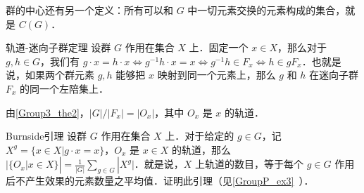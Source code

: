 群的中心还有另一个定义：所有可以和 $G$ 中一切元素交换的元素构成的集合，就是 $C(G)$．

\begin{theorem}{轨道-迷向子群定理}\label{Group3_the2}
设群 $G$ 作用在集合 $X$ 上．固定一个 $x\in X$，那么对于 $g, h\in G$，我们有 $g\cdot x=h\cdot x\iff g^{-1}h\cdot x=x\iff g^{-1}h\in F_x\iff h\in gF_x$．也就是说，如果两个群元素 $g, h$ 能够把 $x$ 映射到同一个元素上，那么 $g$ 和 $h$ 在迷向子群 $F_x$ 的同一个左陪集上．
\end{theorem}

\begin{corollary}{}\label{Group3_cor1}
由\autoref{Group3_the2}，$|G|/|F_x|=|O_x|$，其中 $O_x$ 是 $x$ 的轨道．
\end{corollary}

\begin{exercise}{Burnside引理}\label{Group3_exe2}
设群 $G$ 作用在集合 $X$ 上．对于给定的 $g\in G$，记 $X^g=\{x\in X|g\cdot x=x\}$，$O_x$ 是 $x\in X$ 的轨道，那么 $|\{O_x|x\in X\}|=\frac{1}{|G|}\sum_{g\in G}|X^g|$．就是说，$X$ 上轨道的数目，等于每个 $g\in G$ 作用后不产生效果的元素数量之平均值．证明此引理（见\autoref{GroupP_ex3}~）．
\end{exercise}
